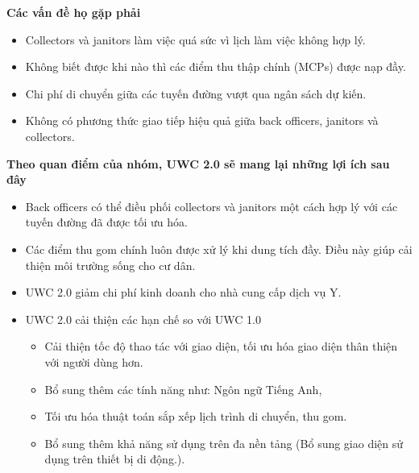\documentclass[a4paper]{article}
\begin{document}
\textbf{Các vấn đề họ gặp phải} 
\begin{itemize}
    \item Collectors và janitors làm việc quá sức vì lịch làm việc không hợp lý. 
    \item Không biết được khi nào thì các điểm thu thập chính (MCPs) được nạp đầy. 
    \item Chi phí di chuyển giữa các tuyến đường vượt qua ngân sách dự kiến. 
    \item Không có phương thức giao tiếp hiệu quả giữa back officers, janitors và collectors. 

\end{itemize}
\textbf{Theo quan điểm của nhóm, UWC 2.0 sẽ mang lại những lợi ích sau đây}
\begin{itemize}
    \item Back officers có thể điều phối collectors và janitors một cách hợp lý với các tuyến đường đã được tối ưu hóa. 
    \item Các điểm thu gom chính luôn được xử lý khi dung tích đầy. Điều này giúp cải thiện môi trường sống cho cư dân. 
    \item UWC 2.0 giảm chi phí kinh doanh cho nhà cung cấp dịch vụ Y. 

    \item  UWC 2.0 cải thiện các hạn chế so với UWC 1.0
    \begin{itemize}
        \item Cải thiện tốc độ thao tác với giao diện, tối ưu hóa giao diện thân thiện với người dùng hơn.
        \item Bổ sung thêm các tính năng như: Ngôn ngữ Tiếng Anh, 
        \item Tối ưu hóa thuật toán sắp xếp lịch trình di chuyển, thu gom.
        \item Bổ sung thêm khả năng sử dụng trên đa nền tảng (Bổ sung giao diện sử dụng trên thiết bị di động.).
    \end{itemize}

\end{itemize}
\end{document}
